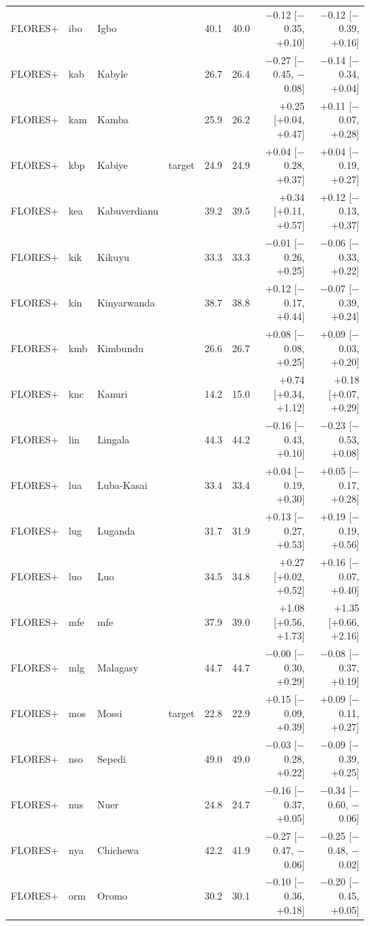 {\begin{longtable}{@{}lllcrrrr@{}}
FLORES+ & ibo & Igbo &  & 40.1 & 40.0 & $-$0.12 [$-$0.35, +0.10] & $-$0.12 [$-$0.39, +0.16] \\
FLORES+ & kab & Kabyle &  & 26.7 & 26.4 & $-$0.27 [$-$0.45, $-$0.08] & $-$0.14 [$-$0.34, +0.04] \\
FLORES+ & kam & Kamba &  & 25.9 & 26.2 & +0.25 [+0.04, +0.47] & +0.11 [$-$0.07, +0.28] \\
FLORES+ & kbp & Kabiye & target & 24.9 & 24.9 & +0.04 [$-$0.28, +0.37] & +0.04 [$-$0.19, +0.27] \\
FLORES+ & kea & Kabuverdianu &  & 39.2 & 39.5 & +0.34 [+0.11, +0.57] & +0.12 [$-$0.13, +0.37] \\
FLORES+ & kik & Kikuyu &  & 33.3 & 33.3 & $-$0.01 [$-$0.26, +0.25] & $-$0.06 [$-$0.33, +0.22] \\
FLORES+ & kin & Kinyarwanda &  & 38.7 & 38.8 & +0.12 [$-$0.17, +0.44] & $-$0.07 [$-$0.39, +0.24] \\
FLORES+ & kmb & Kimbundu &  & 26.6 & 26.7 & +0.08 [$-$0.08, +0.25] & +0.09 [$-$0.03, +0.20] \\
FLORES+ & knc & Kanuri &  & 14.2 & 15.0 & +0.74 [+0.34, +1.12] & +0.18 [+0.07, +0.29] \\
FLORES+ & lin & Lingala &  & 44.3 & 44.2 & $-$0.16 [$-$0.43, +0.10] & $-$0.23 [$-$0.53, +0.08] \\
FLORES+ & lua & Luba-Kasai &  & 33.4 & 33.4 & +0.04 [$-$0.19, +0.30] & +0.05 [$-$0.17, +0.28] \\
FLORES+ & lug & Luganda &  & 31.7 & 31.9 & +0.13 [$-$0.27, +0.53] & +0.19 [$-$0.19, +0.56] \\
FLORES+ & luo & Luo &  & 34.5 & 34.8 & +0.27 [+0.02, +0.52] & +0.16 [$-$0.07, +0.40] \\
FLORES+ & mfe & mfe &  & 37.9 & 39.0 & +1.08 [+0.56, +1.73] & +1.35 [+0.66, +2.16] \\
FLORES+ & mlg & Malagasy &  & 44.7 & 44.7 & $-$0.00 [$-$0.30, +0.29] & $-$0.08 [$-$0.37, +0.19] \\
FLORES+ & mos & Mossi & target & 22.8 & 22.9 & +0.15 [$-$0.09, +0.39] & +0.09 [$-$0.11, +0.27] \\
FLORES+ & nso & Sepedi &  & 49.0 & 49.0 & $-$0.03 [$-$0.28, +0.22] & $-$0.09 [$-$0.39, +0.25] \\
FLORES+ & nus & Nuer &  & 24.8 & 24.7 & $-$0.16 [$-$0.37, +0.05] & $-$0.34 [$-$0.60, $-$0.06] \\
FLORES+ & nya & Chichewa &  & 42.2 & 41.9 & $-$0.27 [$-$0.47, $-$0.06] & $-$0.25 [$-$0.48, $-$0.02] \\
FLORES+ & orm & Oromo &  & 30.2 & 30.1 & $-$0.10 [$-$0.36, +0.18] & $-$0.20 [$-$0.45, +0.05] \\

\end{longtable}}
